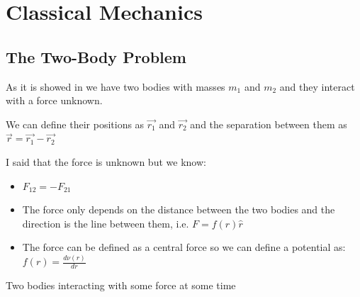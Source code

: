 \setchapterpreamble[u]{\margintoc}
\chapter{Classical Mechanics}

\section{The Two-Body Problem}

As it is showed in  we have two bodies with masses $m_1$ and $m_2$ and they interact with a force unknown.

We can define their positions as $\vec{r_1}$ and $\vec{r_2}$ and the separation between them as $ \vec{r} =\vec{r_1} - \vec{r_2} $

I said that the force is unknown but we know:

\begin{itemize}
    \item $F_{12} = - F_{21}$
    \item The force only depends on the distance between the two bodies and the direction is the line between them, i.e. $F = f(r)\hat{r}$  
    \item The force can be defined as a central force so we can define a potential as: $f(r)=\frac{d\nu(r)}{dr}$ 
\end{itemize}


\begin{marginfigure}[-3cm]
\caption[Two bodies interacting with some force]{Two bodies interacting with some force at some time}
\end{marginfigure}



